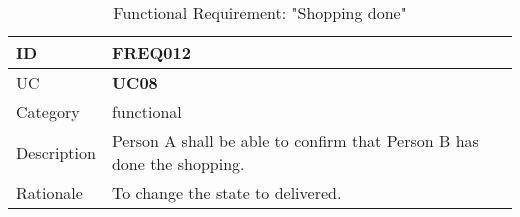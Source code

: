 \vspace{5mm}
\begin{table}[H]
	\begin{tabular}{ |p{2cm}||p{9cm}| }
		\hline
        ID & \textbf{FREQ012}\\ \hline
        UC & \textbf{UC08} \\ \hline
		Category & functional \\ \hline
		Description &
		Person A shall be able to confirm that Person B has done the shopping.
		\\ \hline
		Rationale & To change the state to delivered. \\ \hline
	\end{tabular}
	\caption{Functional Requirement: "Shopping done"}
\end{table}